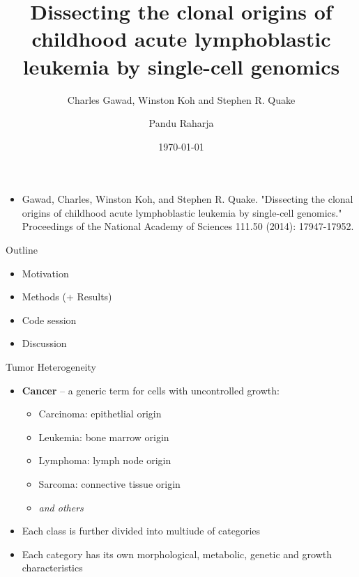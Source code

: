 \documentclass[pdf, aspectratio=169]{beamer}
\title{Dissecting the clonal origins of childhood acute lymphoblastic leukemia by single-cell genomics}
\subtitle{Charles Gawad, Winston Koh and Stephen R. Quake}
\author[shortname]{Pandu Raharja}
\institute[shortinst]{Technische Universit\"at M\"unchen\\
Ludwig-Maximillians-Universit\"at M\"unchen}
\date{\today}
\begin{document}
\begin{frame}
\titlepage
\end{frame}

\begin{frame}
	\begin{itemize}
	\item Gawad, Charles, Winston Koh, and Stephen R. Quake. "Dissecting the clonal origins of childhood acute lymphoblastic leukemia by single-cell genomics." Proceedings of the National Academy of Sciences 111.50 (2014): 17947-17952.
	\end{itemize}
\end{frame}

\begin{frame}{Outline}
	\begin{itemize}
		\item Motivation
		\item Methods (+ Results)
		\item Code session
		\item Discussion 
	\end{itemize}
\end{frame}

\begin{frame}{Tumor Heterogeneity\footnotemark}
	\begin{itemize}
		\item \textbf{Cancer} -- a generic term for cells with uncontrolled growth:
		\begin{itemize}
			\item Carcinoma: epithetlial origin
			\item Leukemia: bone marrow origin
			\item Lymphoma: lymph node origin
			\item Sarcoma: connective tissue origin
			\item \textit{and others}
		\end{itemize}
		\item Each class is further divided into multiude of categories
		\item Each category has its own morphological, metabolic, genetic and growth characteristics
	\end{itemize}
\end{frame}
\end{document}
